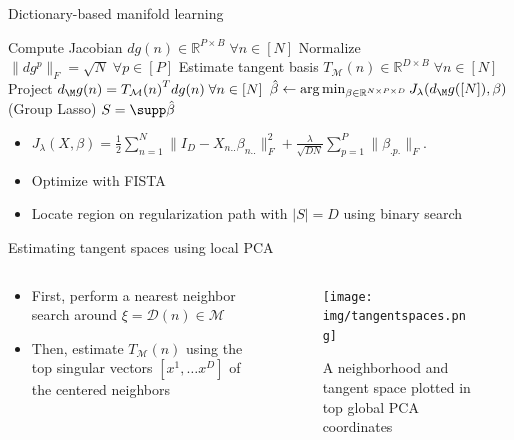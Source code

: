 
\begin{frame}{Dictionary-based manifold learning}
\begin{algorithm}[H]
\caption{\tsalg(Dataset $\mathcal D$, dictionary $g$)}
\begin{algorithmic}[1]
\STATE Compute Jacobian $d g (n) \in \mathbb R^{P \times B} \; \forall  n \in [N]$
\STATE Normalize $\|d g^p \|_F = \sqrt{N} \; \forall  p \in [P]$
\STATE Estimate tangent basis $T_{\mathcal M}(n) \in \mathbb R^{D \times B} \; \forall  n \in [N]$
\STATE Project $d_\M g (n) = {T_{\mathcal M} (n)}^T d g (n) \; \forall  n \in [N]$
\STATE  $\hat \beta \gets \arg \min_{\beta \in \mathbb R^{N \times P \times D}} J_\lambda ( d_\M g ([N]),\beta)$ (Group Lasso)
 $S= \supp \hat  \beta$ 
\end{algorithmic}
\end{algorithm}
\begin{itemize}
\item $J_\lambda (X, \beta) =  \frac{1}{2}\sum_{n=1}^N \| I_D  - X_{n..} \beta_{n..}\|_F^2+\frac{\lambda}{\sqrt{DN}} \sum_{p=1}^P \|\beta_{.p.}\|_F. $
\item Optimize with FISTA
\item Locate region on regularization path with $|S| = D$ using binary search
\end{itemize}
\end{frame}


\begin{frame}{Estimating tangent spaces using local PCA}
\begin{columns}
\begin{column}{0.35\textwidth}
\begin{itemize}
    \item First, perform a nearest neighbor search around $\xi = \mathcal D(n) \in \mathcal M$
    \item Then, estimate $ T_{\mathcal M}(n) $ using the top singular vectors $[x^1, \dotsc x^D]$ of the centered neighbors
\end{itemize}
\end{column}
\begin{column}{0.6\textwidth}
\begin{figure}
    \texttt{[image: img/tangentspaces.png]}
    \caption*{A neighborhood and tangent space plotted in top global PCA coordinates}
\end{figure}
\end{column}
\end{columns}


\end{frame}

